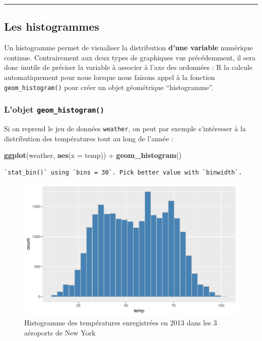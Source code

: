 \documentclass[a4paperpaper,]{article}
\newenvironment{Shaded}{\begin{snugshade}}{\end{snugshade}}
\newcommand{\DataTypeTok}[1]{\textcolor[rgb]{0.00,0.34,0.68}{#1}}
\newcommand{\KeywordTok}[1]{\textcolor[rgb]{0.12,0.11,0.11}{\textbf{#1}}}
\newcommand{\NormalTok}[1]{\textcolor[rgb]{0.12,0.11,0.11}{#1}}
\newcommand{\OperatorTok}[1]{\textcolor[rgb]{0.12,0.11,0.11}{#1}}
\newcommand{\StringTok}[1]{\textcolor[rgb]{0.75,0.01,0.01}{#1}}
\theoremstyle{definition}
\theoremstyle{definition}
\theoremstyle{definition}
\theoremstyle{remark}
\begin{document}
\begin{center}\rule{0.5\linewidth}{\linethickness}\end{center}

\hypertarget{histogram}{%
\subsection{Les histogrammes}\label{histogram}}

Un histogramme permet de visualiser la distribution \textbf{d'une
variable} numérique continue. Contrairement aux deux types de graphiques
vus précédemment, il sera donc inutile de préciser la variable à
associer à l'axe des ordonnées : R la calcule automatiquement pour nous
lorsque nous faisons appel à la fonction \texttt{geom\_histogram()} pour
créer un objet géométrique ``histogramme''.

\hypertarget{lobjet-geom_histogram}{%
\subsubsection{\texorpdfstring{L'objet
\texttt{geom\_histogram()}}{L'objet geom\_histogram()}}\label{lobjet-geom_histogram}}

Si on reprend le jeu de données \texttt{weather}, on peut par exemple
s'intéresser à la distribution des températures tout au long de l'année
:

\begin{Shaded}
\begin{Highlighting}[]
\KeywordTok{ggplot}\NormalTok{(weather, }\KeywordTok{aes}\NormalTok{(}\DataTypeTok{x =}\NormalTok{ temp)) }\OperatorTok{+}
\StringTok{  }\KeywordTok{geom_histogram}\NormalTok{()}
\end{Highlighting}
\end{Shaded}

\begin{verbatim}
`stat_bin()` using `bins = 30`. Pick better value with `binwidth`.
\end{verbatim}

\begin{figure}[htpb]

{\centering \includegraphics[width=0.9\linewidth]{figure/unnamed-chunk-47-1} 

}

\caption{Histogramme des températures enregistrées en 2013 dans les 3 aéroports de New York}\label{fig:unnamed-chunk-47}
\end{figure}
\end{document}
